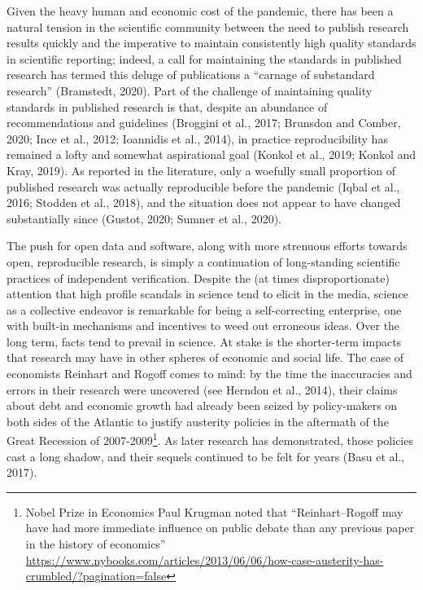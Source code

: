 \documentclass[]{elsarticle} %
\begin{document}
Given the heavy human and economic cost of the pandemic, there has been
a natural tension in the scientific community between the need to
publish research results quickly and the imperative to maintain
consistently high quality standards in scientific reporting; indeed, a
call for maintaining the standards in published research has termed this
deluge of publications a ``carnage of substandard research'' (Bramstedt,
2020). Part of the challenge of maintaining quality standards in
published research is that, despite an abundance of recommendations and
guidelines (Broggini et al., 2017; Brunsdon and Comber, 2020; Ince et
al., 2012; Ioannidis et al., 2014), in practice reproducibility has
remained a lofty and somewhat aspirational goal (Konkol et al., 2019;
Konkol and Kray, 2019). As reported in the literature, only a woefully
small proportion of published research was actually reproducible before
the pandemic (Iqbal et al., 2016; Stodden et al., 2018), and the
situation does not appear to have changed substantially since (Gustot,
2020; Sumner et al., 2020).

The push for open data and software, along with more strenuous efforts
towards open, reproducible research, is simply a continuation of
long-standing scientific practices of independent verification. Despite
the (at times disproportionate) attention that high profile scandals in
science tend to elicit in the media, science as a collective endeavor is
remarkable for being a self-correcting enterprise, one with built-in
mechanisms and incentives to weed out erroneous ideas. Over the long
term, facts tend to prevail in science. At stake is the shorter-term
impacts that research may have in other spheres of economic and social
life. The case of economists Reinhart and Rogoff comes to mind: by the
time the inaccuracies and errors in their research were uncovered (see
Herndon et al., 2014), their claims about debt and economic growth had
already been seized by policy-makers on both sides of the Atlantic to
justify austerity policies in the aftermath of the Great Recession of
2007-2009\footnote{Nobel Prize in Economics Paul Krugman noted that
  ``Reinhart--Rogoff may have had more immediate influence on public
  debate than any previous paper in the history of economics''
  \url{https://www.nybooks.com/articles/2013/06/06/how-case-austerity-has-crumbled/?pagination=false}}.
As later research has demonstrated, those policies cast a long shadow,
and their sequels continued to be felt for years (Basu et al., 2017).
\end{document}
